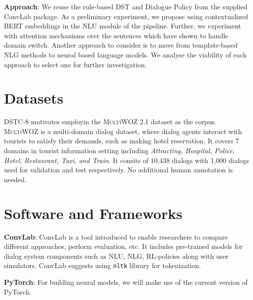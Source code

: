 \documentclass[11pt]{article}
\begin{document}
\smallskip \noindent \textbf{Approach}: We reuse the rule-based DST and Dialogue Policy from the supplied ConvLab package. As a preliminary experiment, we propose using contextualized BERT embeddings in the NLU module of the pipeline. Further, we experiment with attention mechanisms over the sentences which have shown to handle domain switch. Another approach to consider is to move from template-based NLG methods to neural based language models. We analyse the viability of each approach to select one for further investigation. 

\section*{Datasets}

DSTC-8 motivates employin the \textsc{MultiWOZ} 2.1 dataset \cite{budzianowski2018multiwoz} as the corpus. \textsc{MultiWOZ} is a multi-domain dialog dataset, where dialog agents interact with tourists to satisfy their demands, such as making hotel reservation. It covers 7 domains in tourist information setting including \textit{Attracting, Hospital, Police, Hotel, Restaurant, Taxi, and Train}. It consits of 10,438 dialogs with 1,000 dialogs used for validation and test respectively.
No additional human annotation is needed.

\section*{Software and Frameworks}

\noindent \textbf{ConvLab}: ConvLab \cite{lee2019convlab} is a tool introduced to enable researchers to compare different approaches, perform evaluation, etc. It includes pre-trained models for dialog system components such as NLU, NLG, RL-policies along with user simulators. ConvLab suggests using \texttt{nltk} library for tokenization.

\noindent \textbf{PyTorch}: For building neural models, we will make use of the current version of PyTorch.

\printbibliography
\end{document}
